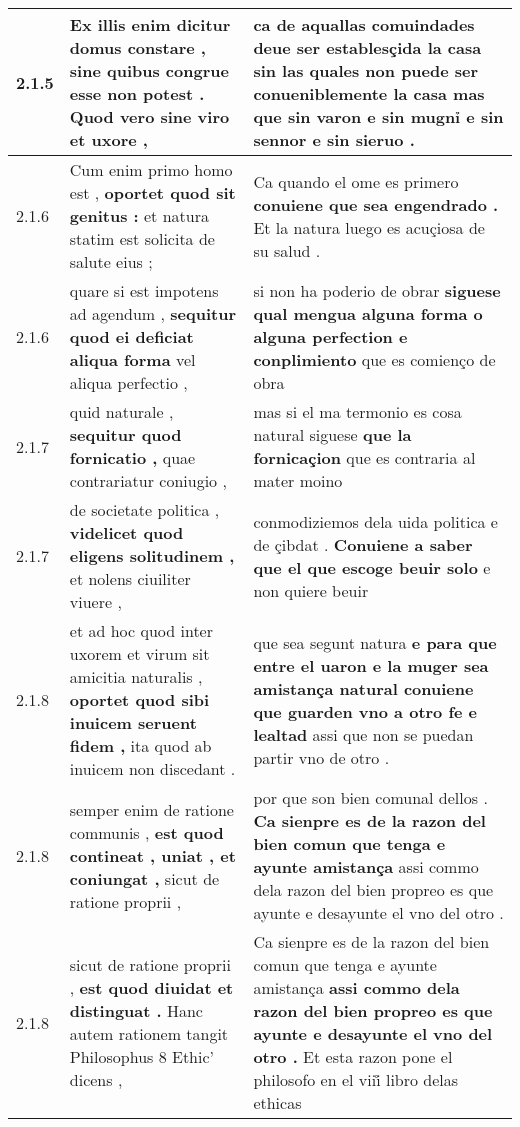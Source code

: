 \begin{tabular}{|p{1cm}|p{6.5cm}|p{6.5cm}|}
2.1.5 & Ex illis enim dicitur domus constare , \textbf{ sine quibus congrue esse non potest . } Quod vero sine viro et uxore , & ca de aquallas comuindades deue ser establesçida la casa \textbf{ sin las quales non puede ser conueniblemente la casa } mas que sin varon e sin mugnỉ e sin sennor e sin sieruo . \\\hline
2.1.6 & Cum enim primo homo est , \textbf{ oportet quod sit genitus : } et natura statim est solicita de salute eius ; & Ca quando el ome es primero \textbf{ conuiene que sea engendrado . } Et la natura luego es acuçiosa de su salud . \\\hline
2.1.6 & quare si est impotens ad agendum , \textbf{ sequitur quod ei deficiat aliqua forma } vel aliqua perfectio , & si non ha poderio de obrar \textbf{ siguese qual mengua alguna forma o alguna perfection e conplimiento } que es comienço de obra \\\hline
2.1.7 & quid naturale , \textbf{ sequitur quod fornicatio , } quae contrariatur coniugio , & mas si el ma termonio es cosa natural siguese \textbf{ que la fornicaçion } que es contraria al mater moino \\\hline
2.1.7 & de societate politica , \textbf{ videlicet quod eligens solitudinem , } et nolens ciuiliter viuere , & conmodiziemos dela uida politica e de çibdat . \textbf{ Conuiene a saber que el que escoge beuir solo } e non quiere beuir \\\hline
2.1.8 & et ad hoc quod inter uxorem et virum sit amicitia naturalis , \textbf{ oportet quod sibi inuicem seruent fidem , } ita quod ab inuicem non discedant . & que sea segunt natura \textbf{ e para que entre el uaron e la muger sea amistança natural conuiene que guarden vno a otro fe e lealtad } assi que non se puedan partir vno de otro . \\\hline
2.1.8 & semper enim de ratione communis , \textbf{ est quod contineat , uniat , et coniungat , } sicut de ratione proprii , & por que son bien comunal dellos . \textbf{ Ca sienpre es de la razon del bien comun que tenga e ayunte amistança } assi commo dela razon del bien propreo es que ayunte e desayunte el vno del otro . \\\hline
2.1.8 & sicut de ratione proprii , \textbf{ est quod diuidat et distinguat . } Hanc autem rationem tangit Philosophus 8 Ethic’ dicens , & Ca sienpre es de la razon del bien comun que tenga e ayunte amistança \textbf{ assi commo dela razon del bien propreo es que ayunte e desayunte el vno del otro . } Et esta razon pone el philosofo en el viii̊ libro delas ethicas \\\hline

\end{tabular}
